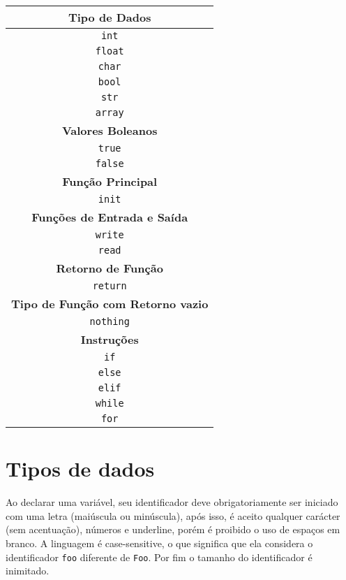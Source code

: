 \documentclass[a4paper,11pt]{article}
\begin{document}
\begin{center}
    \begin{tabular}{|c|}
         \hline
         \textbf{Tipo de Dados}\\
         \hline
         \texttt{int}\\
         \hline
         \texttt{float}\\
         \hline
         \texttt{char}\\
         \hline
         \texttt{bool}\\
         \hline
         \texttt{str}\\
         \hline
         \texttt{array}\\
         \hline
         \textbf{Valores Boleanos}\\
         \hline
         \texttt{true}\\
         \hline
         \texttt{false}\\
         \hline
         \textbf{Função Principal}\\
         \hline
         \texttt{init}\\
         \hline
         \textbf{Funções de Entrada e Saída}\\
         \hline
         \texttt{write}\\
         \hline
         \texttt{read}\\
         \hline
         \textbf{Retorno de Função}\\
         \hline
         \texttt{return}\\
         \hline
         \textbf{Tipo de Função com Retorno vazio}\\
         \hline
         \texttt{nothing}\\
         \hline
         \textbf{Instruções}\\
         \hline
         \texttt{if}\\
         \hline
         \texttt{else}\\
         \hline
         \texttt{elif}\\
         \hline
         \texttt{while}\\
         \hline
         \texttt{for}\\
         \hline
    \end{tabular}
\end{center}

\section{Tipos de dados}
Ao declarar uma variável, seu identificador deve obrigatoriamente ser iniciado com uma letra
(maiúscula ou minúscula), após isso, é aceito qualquer carácter (sem acentuação), números e
underline, porém é proibido o uso de espaços em branco. A linguagem é case-sensitive, o que
significa que ela considera o identificador \texttt{foo} diferente de \texttt{Foo}. Por fim o
tamanho do identificador é inimitado.
\end{document}
